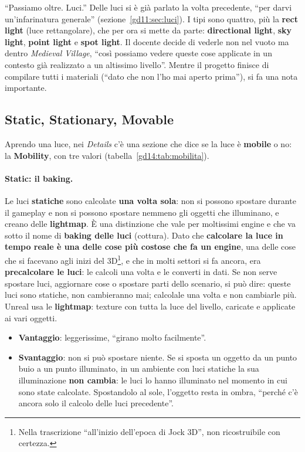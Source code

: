 

``Passiamo oltre. Luci.'' Delle luci si è già parlato la volta precedente, ``per
darvi un'infarinatura generale'' (sezione~\ref{gd11:sec:luci}). I tipi sono quattro,
più la \textbf{rect light} (luce rettangolare), che per ora si mette da parte:
\textbf{directional light}, \textbf{sky light}, \textbf{point light} e
\textbf{spot light}. Il docente decide di vederle non nel vuoto ma dentro
\emph{Medieval Village}, ``così possiamo vedere queste cose applicate in un contesto
già realizzato a un altissimo livello''. Mentre il progetto finisce di compilare
tutti i materiali (``dato che non l'ho mai aperto prima''), si fa una nota
importante.

\subsection{Static, Stationary, Movable}

Aprendo una luce, nei \emph{Details} c'è una sezione che dice se la luce è
\textbf{mobile} o no: la \textbf{Mobility}, con tre valori
(tabella~\ref{gd14:tab:mobilita}).

\paragraph{Static: il baking.} Le luci \textbf{statiche} sono calcolate \textbf{una
volta sola}: non si possono spostare durante il gameplay e non si possono spostare
nemmeno gli oggetti che illuminano, e creano delle \textbf{lightmap}. È una
distinzione che vale per moltissimi engine e che va sotto il nome di
\textbf{baking delle luci} (cottura). Dato che \textbf{calcolare la luce in tempo
reale è una delle cose più costose che fa un engine}, una delle cose che si
facevano agli inizi del 3D\footnote{Nella trascrizione ``all'inizio dell'epoca di
Jock 3D'', non ricostruibile con certezza.}, e che in molti settori si fa ancora,
era \textbf{precalcolare le luci}: le calcoli una volta e le converti in dati. Se
non serve spostare luci, aggiornare cose o spostare parti dello scenario, si può
dire: queste luci sono statiche, non cambieranno mai; calcolale una volta e non
cambiarle più. Unreal usa le \textbf{lightmap}: texture con tutta la luce del
livello, caricate e applicate ai vari oggetti.
\begin{itemize}
  \item \textbf{Vantaggio}: leggerissime, ``girano molto facilmente''.
  \item \textbf{Svantaggio}: non si può spostare niente. Se si sposta un oggetto da
        un punto buio a un punto illuminato, in un ambiente con luci statiche la
        sua illuminazione \textbf{non cambia}: le luci lo hanno illuminato nel
        momento in cui sono state calcolate. Spostandolo al sole, l'oggetto resta
        in ombra, ``perché c'è ancora solo il calcolo delle luci precedente''.
\end{itemize}

